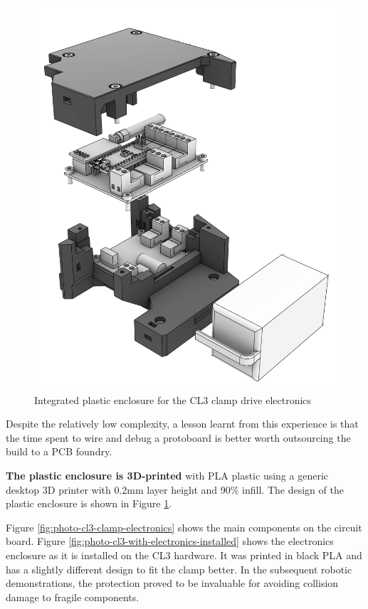 \begin{figure}
\begin{minipage}{0.43\textwidth}
        \includegraphics[width=\textwidth]{images/05/image18.jpg}
        \caption{Integrated plastic enclosure for the CL3 clamp drive electronics}
        \label{fig:plastic-enclosure-cl3-clamp-electronics}
    \end{minipage}
\end{figure}

Despite the relatively low complexity, a lesson learnt from this experience is that the time spent to wire and debug a protoboard is better worth outsourcing the build to a PCB foundry. 

\textbf{The plastic enclosure is 3D-printed} with PLA plastic using a generic desktop 3D printer with 0.2mm layer height and 90\% infill. The design of the plastic enclosure is shown in Figure \ref{fig:plastic-enclosure-cl3-clamp-electronics}. 

Figure \ref{fig:photo-cl3-clamp-electronics} shows the main components on the circuit board.
Figure \ref{fig:photo-cl3-with-electronics-installed} shows the electronics enclosure as it is installed on the CL3 hardware. It was printed in black PLA and has a slightly different design to fit the clamp better.
In the subsequent robotic demonstrations, the protection proved to be invaluable for avoiding collision damage to fragile components.

